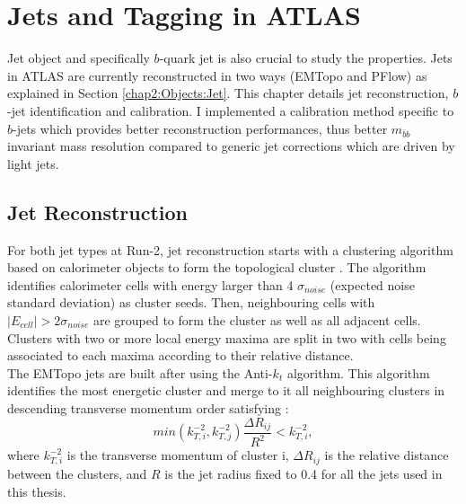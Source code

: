 \newpage
\chapter{Jets and Tagging in ATLAS}
\label{Jet}
Jet object and specifically $b$-quark jet is also crucial to study the \HHyybb properties. Jets in ATLAS are currently reconstructed in two ways (EMTopo and PFlow) as explained in Section \ref{chap2:Objects:Jet}. This chapter details jet reconstruction, $b$-jet identification and calibration. I implemented a calibration method specific to $b$-jets which provides better reconstruction performances, thus better $m_{\bar{b}b}$ invariant mass resolution compared to generic jet corrections which are driven by light jets.  
\section{Jet Reconstruction}
\label{Jet:JR}
For both jet types at Run-2, jet reconstruction starts with a clustering algorithm based on calorimeter objects to form the topological cluster \cite{Jet_Algo_Perf}. The algorithm identifies calorimeter cells with energy larger than 4 $\sigma_{noise}$ (expected noise standard deviation) as cluster seeds. Then, neighbouring cells with $|E_{cell}| > 2\sigma_{noise}$ are grouped to form the cluster as well as all adjacent cells. Clusters with two or more local energy maxima are split in two with cells being associated to each maxima according to their relative distance. \\
The EMTopo jets are built after using the Anti-$k_t$ algorithm. This algorithm identifies the most energetic cluster and merge to it all neighbouring clusters in descending transverse momentum order satisfying :
\begin{equation}
    min(k_{T,i}^{-2}, k_{T,j}^{-2}) \frac{\Delta R_{ij}}{R^2} < k_{T,i}^{-2},
\end{equation}
where $k_{T,i}^{-2}$ is the transverse momentum of cluster i, $\Delta R_{ij}$ is the relative distance between the clusters, and $R$ is the jet radius fixed to 0.4 for all the jets used in this thesis. \\
